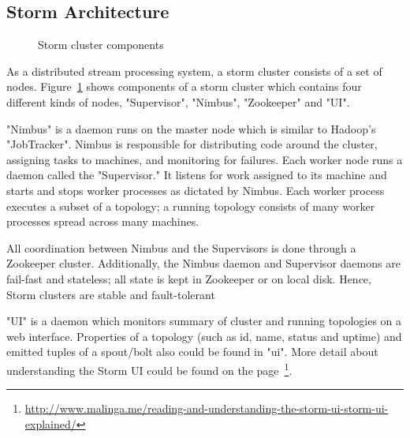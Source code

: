 \subsection{Storm Architecture}
\begin{figure}
  \begin{center}
   \caption{Storm cluster components}
   \label{fig:storm_cluster}
  \end{center}
\end{figure}

As a distributed stream processing system, a storm cluster consists of a set of nodes. Figure~\ref{fig:storm_cluster} shows components of a storm cluster which contains four different kinds of nodes, "Supervisor", "Nimbus", "Zookeeper" and "UI". 

"Nimbus" is a daemon runs on the master node which is similar to Hadoop's "JobTracker". Nimbus is responsible for distributing code around the cluster, assigning tasks to machines, and monitoring for failures. Each worker node runs a daemon called the "Supervisor." It listens for work assigned to its machine and starts and stops worker processes as dictated by Nimbus. Each worker process executes a subset of a topology; a running topology consists of many worker processes spread across many machines.

All coordination between Nimbus and the Supervisors is done through a Zookeeper cluster. Additionally, the Nimbus daemon and Supervisor daemons are fail-fast and stateless; all state is kept in Zookeeper or on local disk. Hence, Storm clusters are stable and fault-tolerant

"UI" is a daemon which monitors summary of cluster and running topologies on a web interface. Properties of a topology (such as id, name, status and uptime) and emitted tuples of a spout/bolt also could be found in "ui". More detail about understanding the Storm UI could be found on the page~\footnote{\url{http://www.malinga.me/reading-and-understanding-the-storm-ui-storm-ui-explained/}}.


